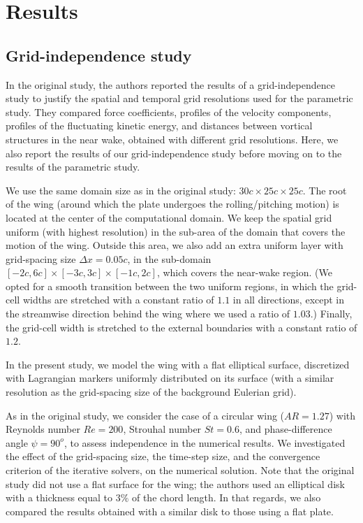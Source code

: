\section{Results}

\subsection{Grid-independence study}

In the original study, the authors reported the results of a grid-independence study to justify the spatial and temporal grid resolutions used for the parametric study.
They compared force coefficients, profiles of the velocity components, profiles of the fluctuating kinetic energy, and distances between vortical structures in the near wake, obtained with different grid resolutions.
Here, we also report the results of our grid-independence study before moving on to the results of the parametric study.

We use the same domain size as in the original study: $30c \times 25c \times 25c$.
The root of the wing (around which the plate undergoes the rolling/pitching motion) is located at the center of the computational domain.
We keep the spatial grid uniform (with highest resolution) in the sub-area of the domain that covers the motion of the wing.
Outside this area, we also add an extra uniform layer with grid-spacing size $\Delta x = 0.05c$, in the sub-domain $\left[ -2c, 6c \right] \times \left[ -3c, 3c \right] \times \left[ -1c, 2c \right]$, which covers the near-wake region.
(We opted for a smooth transition between the two uniform regions, in which the grid-cell widths are stretched with a constant ratio of $1.1$ in all directions, except in the streamwise direction behind the wing where we used a ratio of $1.03$.)
Finally, the grid-cell width is stretched to the external boundaries with a constant ratio of $1.2$.

In the present study, we model the wing with a flat elliptical surface, discretized with Lagrangian markers uniformly distributed on its surface (with a similar resolution as the grid-spacing size of the background Eulerian grid).

As in the original study, we consider the case of a circular wing ($AR = 1.27$) with Reynolds number $Re = 200$, Strouhal number $St = 0.6$, and phase-difference angle $\psi = 90^o$, to assess independence in the numerical results.
We investigated the effect of the grid-spacing size, the time-step size, and the convergence criterion of the iterative solvers, on the numerical solution.
Note that the original study did not use a flat surface for the wing; the authors used an elliptical disk with a thickness equal to $3\%$ of the chord length.
In that regards, we also compared the results obtained with a similar disk to those using a flat plate.

